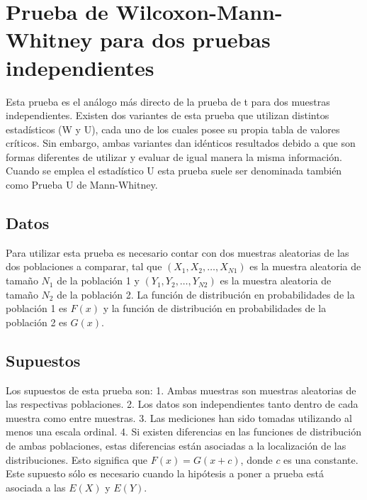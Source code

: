 \documentclass[]{book}
\theoremstyle{definition}
\theoremstyle{definition}
\theoremstyle{definition}
\theoremstyle{remark}
\begin{document}
\hypertarget{prueba-de-wilcoxon-mann-whitney-para-dos-pruebas-independientes}{%
\chapter{Prueba de Wilcoxon-Mann-Whitney para dos pruebas
independientes}\label{prueba-de-wilcoxon-mann-whitney-para-dos-pruebas-independientes}}

Esta prueba es el análogo más directo de la prueba de t para dos
muestras independientes. Existen dos variantes de esta prueba que
utilizan distintos estadísticos (W y U), cada uno de los cuales posee su
propia tabla de valores críticos. Sin embargo, ambas variantes dan
idénticos resultados debido a que son formas diferentes de utilizar y
evaluar de igual manera la misma información. Cuando se emplea el
estadístico U esta prueba suele ser denominada también como Prueba U de
Mann-Whitney.

\hypertarget{datos}{%
\section{Datos}\label{datos}}

Para utilizar esta prueba es necesario contar con dos muestras
aleatorias de las dos poblaciones a comparar, tal que
\(\left ({X_1,X_2,…,X_{N1}}\right )\) es la muestra aleatoria de tamaño
\(N_1\) de la población 1 y \(\left ({Y_1,Y_2,…,Y_{N2}} \right )\) es la
muestra aleatoria de tamaño \(N_2\) de la población 2. La función de
distribución en probabilidades de la población 1 es \(F(x)\) y la
función de distribución en probabilidades de la población 2 es \(G(x)\).

\hypertarget{supuestos}{%
\section{Supuestos}\label{supuestos}}

Los supuestos de esta prueba son: 1. Ambas muestras son muestras
aleatorias de las respectivas poblaciones. 2. Los datos son
independientes tanto dentro de cada muestra como entre muestras. 3. Las
mediciones han sido tomadas utilizando al menos una escala ordinal. 4.
Si existen diferencias en las funciones de distribución de ambas
poblaciones, estas diferencias están asociadas a la localización de las
distribuciones. Esto significa que \(F(x)=G(x+c)\), donde \(c\) es una
constante. Este supuesto sólo es necesario cuando la hipótesis a poner a
prueba está asociada a las \(E(X)\) y \(E(Y)\).
\end{document}
